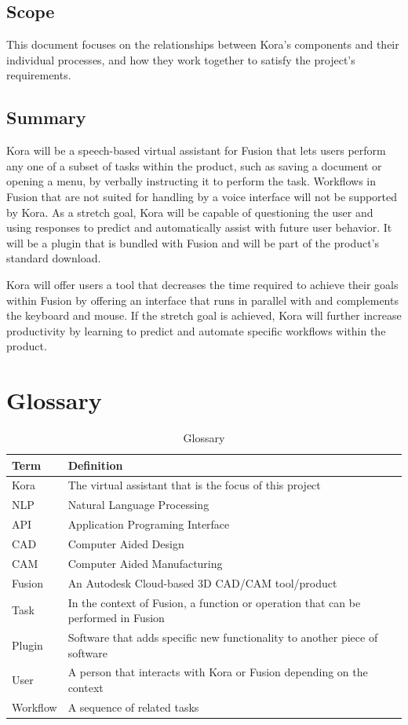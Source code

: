 \documentclass[onecolumn, draftclsnofoot,10pt, compsoc]{IEEEtran}
\begin{document}
	\subsection{Scope}
		This document focuses on the relationships between Kora's components and their individual processes, and how they work together to satisfy the project's requirements.
	
	
	\subsection{Summary}
		Kora will be a speech-based virtual assistant for Fusion that lets users perform any one of a subset of tasks within the product, such as saving a document or opening a menu, by verbally instructing it to perform the task.
		Workflows in Fusion that are not suited for handling by a voice interface will not be supported by Kora.
		As a stretch goal, Kora will be capable of questioning the user and using responses to predict and automatically assist with future user behavior.
		It will be a plugin that is bundled with Fusion and will be part of the product's standard download. 
		
		Kora will offer users a tool that decreases the time required to achieve their goals within Fusion by offering an interface that runs in parallel with and complements the keyboard and mouse.
		If the stretch goal is achieved, Kora will further increase productivity by learning to predict and automate specific workflows within the product.

\section{Glossary}
	\begin{table}[H]
		\centering
		\caption{Glossary}
		\label{my-label}
		\begin{tabular}{|l|l|}
			\hline
			\textbf{Term} & \textbf{Definition} \\ \hline
			Kora & The virtual assistant that is the focus of this project \\ \hline
			NLP & Natural Language Processing \\ \hline
			API & Application Programing Interface \\ \hline
			CAD & Computer Aided Design \\ \hline
			CAM & Computer Aided Manufacturing \\ \hline
			Fusion & An Autodesk Cloud-based 3D CAD/CAM tool/product \\ \hline
			Task & In the context of Fusion, a function or operation that can be performed in Fusion \\ \hline
			Plugin & Software that adds specific new functionality to another piece of software \\ \hline
			User & A person that interacts with Kora or Fusion depending on the context \\ \hline
			Workflow & A sequence of related tasks \\ \hline
		\end{tabular}
	\end{table}
\end{document}
